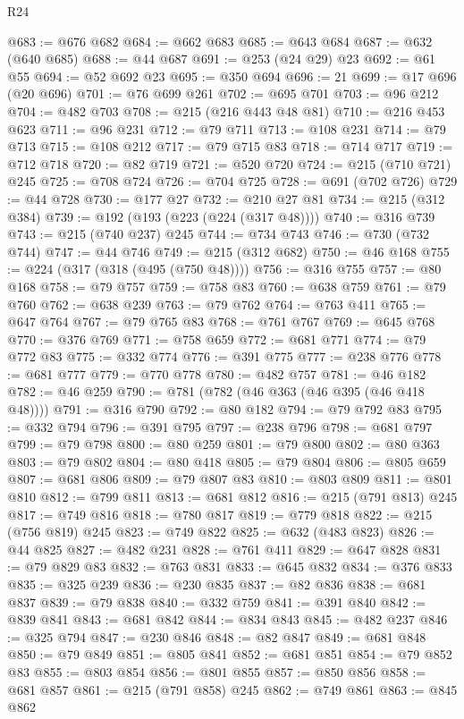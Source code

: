 \begin{lexlean}{R24}
\begin{coremodule}
@683 := @676 @682
@684 := @662 @683
@685 := @643 @684
@687 := @632 (@640 @685)
@688 := @44 @687
@691 := @253 (@24 @29) @23
@692 := @61 @55
@694 := @52 @692 @23
@695 := @350 @694
@696 := 21
@699 := @17 @696 (@20 @696)
@701 := @76 @699 @261
@702 := @695 @701
@703 := @96 @212
@704 := @482 @703
@708 := @215 (@216 @443 @48 @81)
@710 := @216 @453 @623
@711 := @96 @231
@712 := @79 @711
@713 := @108 @231
@714 := @79 @713
@715 := @108 @212
@717 := @79 @715 @83
@718 := @714 @717
@719 := @712 @718
@720 := @82 @719
@721 := @520 @720
@724 := @215 (@710 @721) @245
@725 := @708 @724
@726 := @704 @725
@728 := @691 (@702 @726)
@729 := @44 @728
@730 := @177 @27
@732 := @210 @27 @81
@734 := @215 (@312 @384)
@739 := @192 (@193 (@223 (@224 (@317 @48))))
@740 := @316 @739
@743 := @215 (@740 @237) @245
@744 := @734 @743
@746 := @730 (@732 @744)
@747 := @44 @746
@749 := @215 (@312 @682)
@750 := @46 @168
@755 := @224 (@317 (@318 (@495 (@750 @48))))
@756 := @316 @755
@757 := @80 @168
@758 := @79 @757
@759 := @758 @83
@760 := @638 @759
@761 := @79 @760
@762 := @638 @239
@763 := @79 @762
@764 := @763 @411
@765 := @647 @764
@767 := @79 @765 @83
@768 := @761 @767
@769 := @645 @768
@770 := @376 @769
@771 := @758 @659
@772 := @681 @771
@774 := @79 @772 @83
@775 := @332 @774
@776 := @391 @775
@777 := @238 @776
@778 := @681 @777
@779 := @770 @778
@780 := @482 @757
@781 := @46 @182
@782 := @46 @259
@790 := @781 (@782 (@46 @363 (@46 @395 (@46 @418 @48))))
@791 := @316 @790
@792 := @80 @182
@794 := @79 @792 @83
@795 := @332 @794
@796 := @391 @795
@797 := @238 @796
@798 := @681 @797
@799 := @79 @798
@800 := @80 @259
@801 := @79 @800
@802 := @80 @363
@803 := @79 @802
@804 := @80 @418
@805 := @79 @804
@806 := @805 @659
@807 := @681 @806
@809 := @79 @807 @83
@810 := @803 @809
@811 := @801 @810
@812 := @799 @811
@813 := @681 @812
@816 := @215 (@791 @813) @245
@817 := @749 @816
@818 := @780 @817
@819 := @779 @818
@822 := @215 (@756 @819) @245
@823 := @749 @822
@825 := @632 (@483 @823)
@826 := @44 @825
@827 := @482 @231
@828 := @761 @411
@829 := @647 @828
@831 := @79 @829 @83
@832 := @763 @831
@833 := @645 @832
@834 := @376 @833
@835 := @325 @239
@836 := @230 @835
@837 := @82 @836
@838 := @681 @837
@839 := @79 @838
@840 := @332 @759
@841 := @391 @840
@842 := @839 @841
@843 := @681 @842
@844 := @834 @843
@845 := @482 @237
@846 := @325 @794
@847 := @230 @846
@848 := @82 @847
@849 := @681 @848
@850 := @79 @849
@851 := @805 @841
@852 := @681 @851
@854 := @79 @852 @83
@855 := @803 @854
@856 := @801 @855
@857 := @850 @856
@858 := @681 @857
@861 := @215 (@791 @858) @245
@862 := @749 @861
@863 := @845 @862

\end{coremodule}
\end{lexlean}
